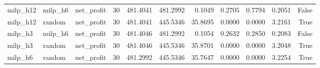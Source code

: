 \begin{tabular}{lllrrrrrrrr}
milp_h12 & milp_h6 & net_profit & 30 & 481.4041 & 481.2992 & 0.1049 & 0.2705 & 0.7794 & 0.2051 & False \\
milp_h12 & random & net_profit & 30 & 481.4041 & 445.5346 & 35.8695 & 0.0000 & 0.0000 & 3.2161 & True \\
milp_h3 & milp_h6 & net_profit & 30 & 481.4046 & 481.2992 & 0.1054 & 0.2632 & 0.2850 & 0.2083 & False \\
milp_h3 & random & net_profit & 30 & 481.4046 & 445.5346 & 35.8701 & 0.0000 & 0.0000 & 3.2048 & True \\
milp_h6 & random & net_profit & 30 & 481.2992 & 445.5346 & 35.7647 & 0.0000 & 0.0000 & 3.2254 & True \\
\bottomrule
\end{tabular}
